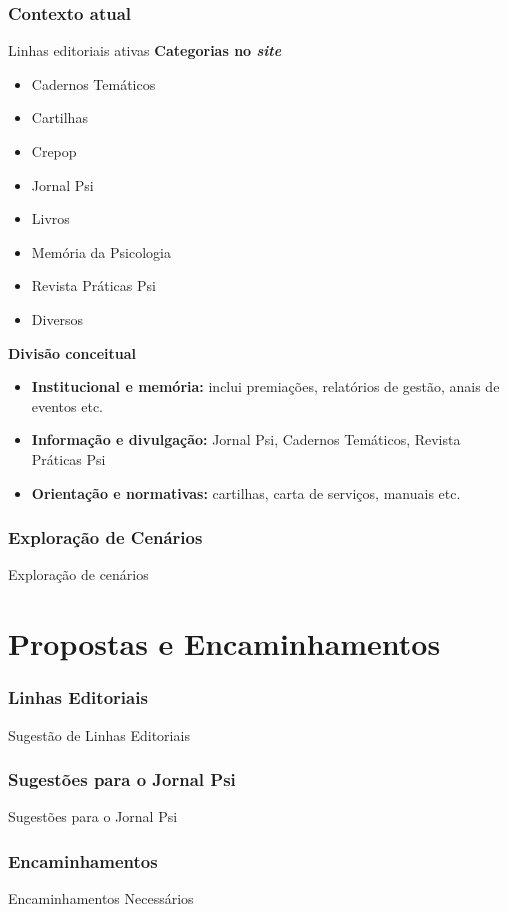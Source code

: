\documentclass{beamer}
\begin{document}
\section{Contexto atual}
\begin{frame}{Linhas editoriais ativas}
    \normalsize
    \textbf{Categorias no \textit{site}}
    
    \scriptsize
    \begin{itemize}
        \item Cadernos Temáticos
        \item Cartilhas
        \item Crepop
        \item Jornal Psi
        \item Livros
        \item Memória da Psicologia
        \item Revista Práticas Psi
        \item Diversos
    \end{itemize}
    
    \vspace{0.5em}
    
    \normalsize
    \textbf{Divisão conceitual}
    
    \scriptsize
    \begin{itemize}
        \item \textbf{Institucional e memória:} inclui premiações, relatórios de gestão, anais de eventos etc.
        \item \textbf{Informação e divulgação:} Jornal Psi, Cadernos Temáticos, Revista Práticas Psi
        \item \textbf{Orientação e normativas:} cartilhas, carta de serviços, manuais etc.
    \end{itemize}
\end{frame}

\section{Exploração de Cenários}
\begin{frame}{Exploração de cenários}
\end{frame}

\part{Propostas e Encaminhamentos}
\section{Linhas Editoriais}
\begin{frame}{Sugestão de Linhas Editoriais}
\end{frame}

\section{Sugestões para o Jornal Psi}
\begin{frame}{Sugestões para o Jornal Psi}
\end{frame}

\section{Encaminhamentos}
\begin{frame}{Encaminhamentos Necessários}
\end{frame}
\end{document}
